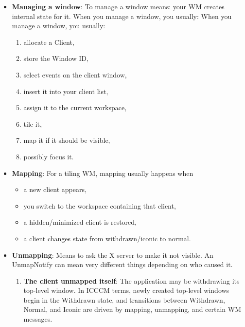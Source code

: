 \documentclass{report}
\begin{document}
\begin{itemize}
\begin{itemize}
                \item a window your WM temporarily unmapped while rearranging.
            \end{itemize}
            The X server generates \textbf{MapNotify} and \textbf{UnmapNotify} when a window changes between mapped and unmapped states. DestroyNotify is generated when a client destroys a window with XDestroyWindow or related operations.
        \item \textbf{Managing a window}: To manage a window means: your WM creates internal state for it. When you manage a window, you usually:
            When you manage a window, you usually:
            \begin{enumerate}
                \item allocate a Client,
                \item store the Window ID,
                \item select events on the client window,
                \item insert it into your client list,
                \item assign it to the current workspace,
                \item tile it,
                \item map it if it should be visible,
                \item possibly focus it.
            \end{enumerate}
        \item \textbf{Mapping}: For a tiling WM, mapping usually happens when
            \begin{itemize}
                \item a new client appears,
                \item you switch to the workspace containing that client,
                \item a hidden/minimized client is restored,
                \item a client changes state from withdrawn/iconic to normal.
            \end{itemize}
        \item \textbf{Unmapping}: Means to ask the X server to make it not visible. An UnmapNotify can mean very different things depending on who caused it.
            \begin{enumerate}[label=(\alph*)]
                \item \textbf{The client unmapped itself}: The application may be withdrawing its top-level window. In ICCCM terms, newly created top-level windows begin in the Withdrawn state, and transitions between Withdrawn, Normal, and Iconic are driven by mapping, unmapping, and certain WM messages. 

\end{enumerate}
\end{itemize}
\end{document}
